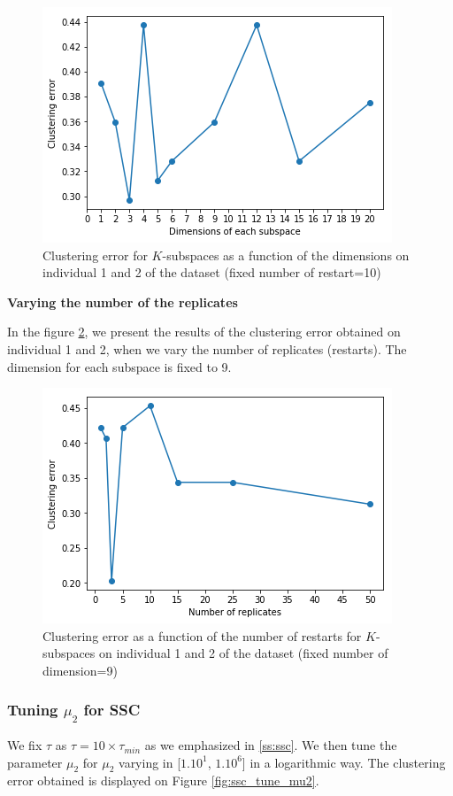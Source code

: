 \documentclass[a4paper, 11pt]{article}
\begin{document}
\begin{figure}[H]
	\centering
	\includegraphics[width=.7\linewidth]{ksubspaces_dim.png}
	\caption{Clustering error for $K$-subspaces as a function of the dimensions on individual 1 and 2 of the dataset (fixed number of restart=10)}
	\label{fig:k-subspaces-dim}
\end{figure}

\textbf{Varying the number of the replicates}

In the figure \ref{fig:k-subspaces-restarts}, we present the results of the clustering error obtained on individual 1 and 2, when we vary the number of replicates (restarts). The dimension for each subspace is fixed to 9.

\begin{figure}[H]
	\centering
	\includegraphics[width=.7\linewidth]{ksubspaces_restarts.png}
	\caption{Clustering error as a function of the number of restarts for $K$-subspaces on individual 1 and 2 of the dataset (fixed number of dimension=9)}
	\label{fig:k-subspaces-restarts}
\end{figure}


\subsubsection{Tuning $\mu_2$ for SSC} \label{sss:tune_ssc}
We fix $\tau$ as $\tau = 10 \times \tau_{min}$ as we emphasized in \ref{ss:ssc}. We then tune the parameter $\mu_2$ for $\mu_2$ varying in
[$1.10^1$, $1.10^6$] in a logarithmic way. The clustering error obtained is displayed on Figure \ref{fig:ssc_tune_mu2}.
\end{document}
